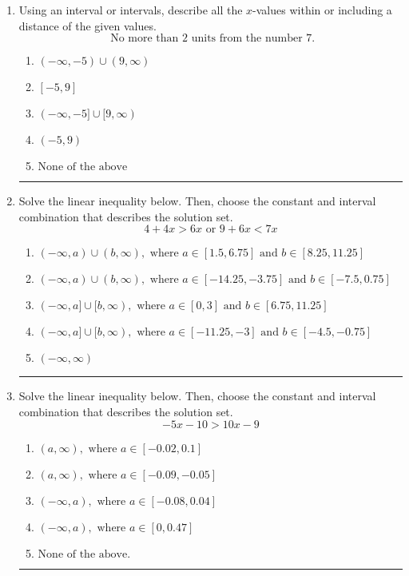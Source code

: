 \documentclass[14pt]{extbook}
\newcommand{\litem}[1]{\item#1\hspace*{-1cm}\rule{\textwidth}{0.4pt}}
\begin{document}
\begin{enumerate}
{\begin{enumerate}[label=\Alph*.]
\end{enumerate} }
\litem{
Using an interval or intervals, describe all the $x$-values within or including a distance of the given values.\[ \text{ No more than } 2 \text{ units from the number } 7. \]\begin{enumerate}[label=\Alph*.]
\item \( (-\infty, -5) \cup (9, \infty) \)
\item \( [-5, 9] \)
\item \( (-\infty, -5] \cup [9, \infty) \)
\item \( (-5, 9) \)
\item \( \text{None of the above} \)

\end{enumerate} }
\litem{
Solve the linear inequality below. Then, choose the constant and interval combination that describes the solution set.\[ 4 + 4 x > 6 x \text{ or } 9 + 6 x < 7 x \]\begin{enumerate}[label=\Alph*.]
\item \( (-\infty, a) \cup (b, \infty), \text{ where } a \in [1.5, 6.75] \text{ and } b \in [8.25, 11.25] \)
\item \( (-\infty, a) \cup (b, \infty), \text{ where } a \in [-14.25, -3.75] \text{ and } b \in [-7.5, 0.75] \)
\item \( (-\infty, a] \cup [b, \infty), \text{ where } a \in [0, 3] \text{ and } b \in [6.75, 11.25] \)
\item \( (-\infty, a] \cup [b, \infty), \text{ where } a \in [-11.25, -3] \text{ and } b \in [-4.5, -0.75] \)
\item \( (-\infty, \infty) \)

\end{enumerate} }
\litem{
Solve the linear inequality below. Then, choose the constant and interval combination that describes the solution set.\[ -5x -10 > 10x -9 \]\begin{enumerate}[label=\Alph*.]
\item \( (a, \infty), \text{ where } a \in [-0.02, 0.1] \)
\item \( (a, \infty), \text{ where } a \in [-0.09, -0.05] \)
\item \( (-\infty, a), \text{ where } a \in [-0.08, 0.04] \)
\item \( (-\infty, a), \text{ where } a \in [0, 0.47] \)
\item \( \text{None of the above}. \)

\end{enumerate} }
\end{enumerate}
\end{document}
